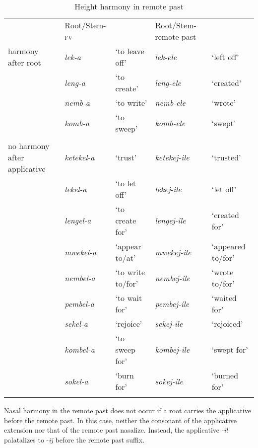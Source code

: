 \documentclass[output=paper]{langsci/langscibook}
\begin{document}
\begin{table}
\begin{tabular}{lllll}
\lsptoprule
 & Root/Stem-\textsc{fv} &  & Root/Stem-remote past & \\
harmony after root & \textit{lek-a} & `to leave off' & \textit{lek-ele} & `left off' \\
 & \textit{leng-a} & `to create' & \textit{leng-ele} & `created' \\
 & \textit{nemb-a} & `to write' & \textit{nemb-ele} & `wrote' \\
 & \textit{komb-a} & `to sweep' & \textit{komb-ele} & `swept' \\
 &   &  &  &  \\
no harmony after applicative & \textit{ketekel-a} & `trust' & \textit{ketekej-ile} & `trusted' \\
 & \textit{lekel-a} & `to let off' & \textit{lekej-ile} & `let off' \\
 & \textit{lengel-a} & `to create for' & \textit{lengej-ile} & `created for' \\
 & \textit{mwekel-a} & `appear to/at' & \textit{mwekej-ile} & `appeared to/for' \\
 & \textit{nembel-a} & `to write to/for' & \textit{nembej-ile} & `wrote to/for' \\
 & \textit{pembel-a} & `to wait for' & \textit{pembej-ile} & `waited for' \\
 & \textit{sekel-a} & `rejoice' & \textit{sekej-ile} & `rejoiced' \\
 & \textit{kombel-a} & `to sweep for' & \textit{kombej-ile} & `swept for' \\
 & \textit{sokel-a} & `burn for' & \textit{sokej-ile} & `burned for' \\

\lspbottomrule
\end{tabular}

\caption{Height harmony in remote past}
\label{tab:14.kawasha}

\end{table}




Nasal harmony in the remote past does not occur if a root carries the applicative before the remote past. In this case, neither the consonant of the applicative extension nor that of the remote past nasalize. Instead, the applicative -\textit{il} palatalizes to -\textit{ij} before the remote past suffix. 
\end{document}
